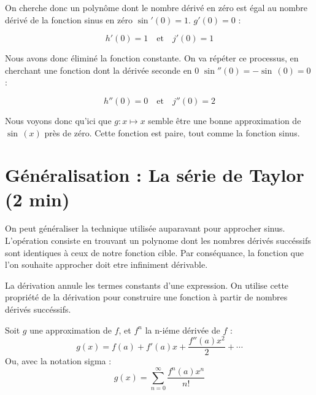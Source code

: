 \documentclass[DIV=12]{scrartcl}
\begin{document}
    On cherche donc un polynôme dont le nombre dérivé en zéro est égal au nombre dérivé de la fonction sinus en zéro $\sin'(0)=1$. $g'(0)=0$ :
    
    \[h'(0)=1\quad\text{et}\quad j'(0)=1\]

    Nous avons donc éliminé la fonction constante. On va répéter ce processus, en cherchant une fonction dont la dérivée seconde en 0 $\sin''(0)=-\sin\,(0)=0$ :
    
    \[h''(0)=0\quad\text{et}\quad j''(0)=2\]

    Nous voyons donc qu'ici que $g:x\mapsto x$ semble être une bonne approximation de~$\sin\,(x)$ près de zéro. Cette fonction est paire, tout comme la fonction sinus.

    \section{Généralisation : La série de Taylor (2 min)}
    On peut généraliser la technique utilisée auparavant pour approcher sinus. L'opération consiste en trouvant un polynome dont les nombres dérivés succéssifs sont identiques à ceux de notre fonction cible. Par conséquance, la fonction que l'on souhaite approcher doit etre infiniment dérivable.

    La dérivation annule les termes constants d'une expression. On utilise cette propriété de la dérivation pour construire une fonction à partir de nombres dérivés succéssifs.

    Soit $g$ une approximation de $f$, et $f^n$ la n-iéme dérivée de $f$ : \[g(x)=f(a)+f'(a)x+\frac{f''(a)x^2}{2}+\dotsb\] Ou, avec la notation sigma : \[g(x)=\sum_{n=0}^{\infty}\frac{f^n(a)x^n}{n!}\]
\end{document}

